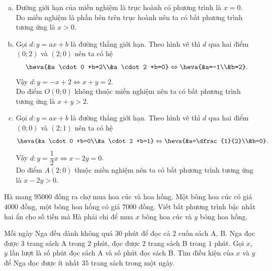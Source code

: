 \begin{bt}
\begin{enumerate}[a)]
	\item Đường giới hạn của miền nghiệm là trục hoành có phương trình là $x=0$.\\
	Do miền nghiệm là phần bên trên trục hoành nên ta có bất phương trình tương ứng là $x>0$.
	\item Gọi $d \colon y =ax+b$ là đường thẳng giới hạn. Theo hình vẽ thì $d$ qua hai điểm $(0;2)$ và $(2;0)$ nên ta có hệ
	$$\heva{&a \cdot 0 +b=2\\&a \cdot 2 +b=0} \Leftrightarrow \heva{&a=-1\\&b=2}.$$
	Vậy $d \colon y=-x+2 \Leftrightarrow x+y=2$.\\
	Do điểm $O(0;0)$ không thuộc miền nghiệm nên ta có bất phương trình tương ứng là $x+y>2$.
	\item Gọi $d \colon y =ax+b$ là đường thẳng giới hạn. Theo hình vẽ thì $d$ qua hai điểm $(0;0)$ và $(2;1)$ nên ta có hệ
	$$\heva{&a \cdot 0 +b=0\\&a \cdot 2 +b=1} \Leftrightarrow \heva{&a=\dfrac{1}{2}\\&b=0}.$$
	Vậy $d \colon y=\dfrac{1}{2}x \Leftrightarrow x-2y=0$.\\
	Do điểm $A(2;0)$ thuộc miền nghiệm nên ta có bất phương trình tương ứng là $x-2y>0$.
\end{enumerate}
\end{bt}

\begin{bt}%
	Hà mang $95000$ đồng ra chợ mua hoa cúc và hoa hồng. Một bông hoa cúc có giá $4000$ đồng, một bông hoa hồng có giá $7000$ đồng. Viết bất phương trình bậc nhất hai ẩn cho số tiền mà Hà phải chi để mua $x$ bông hoa cúc và $y$ bông hoa hồng.  
\end{bt}

\begin{bt}%
	Mỗi ngày Nga đều dành không quá $30$ phút để đọc cả $2$ cuốn sách A, B. Nga đọc được $3$ trang sách A trong $2$ phút, đọc được $2$ trang sách B trong $1$ phút. Gọi $x$, $y$ lần lượt là số phút đọc sách A và số phút đọc sách B. Tìm điều kiện của $x$ và $y$ để Nga đọc được ít nhất $35$ trang sách trong một ngày.
\end{bt}

